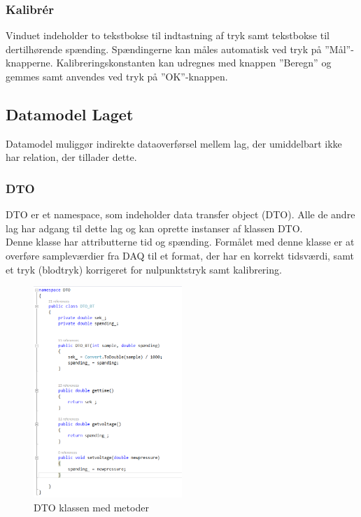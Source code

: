 \subsubsection{Kalibrér}
Vinduet indeholder to tekstbokse til indtastning af tryk samt tekstbokse til dertilhørende spænding. Spændingerne kan måles automatisk ved tryk på ”Mål”\--knapperne.
Kalibreringskonstanten kan udregnes med knappen ”Beregn” og gemmes samt anvendes ved tryk på ”OK”\--knappen.

\subsection{Datamodel Laget}
Datamodel muliggør indirekte dataoverførsel mellem lag, der umiddelbart ikke har relation, der tillader dette.

\subsubsection{DTO}
DTO er et namespace, som indeholder data transfer object (DTO). Alle de andre lag har adgang til dette lag og kan oprette instanser af klassen DTO.\\
Denne klasse har attributterne tid og spænding. Formålet med denne klasse er at overføre sampleværdier fra DAQ til et format, der har en korrekt tidsværdi, samt et tryk (blodtryk) korrigeret for nulpunktstryk samt kalibrering.
\begin{figure}[H]
	\centering
	\includegraphics[width=0.5\textwidth]{Figurer/DTO_kode}
	\caption{DTO klassen med metoder}
\end{figure}

